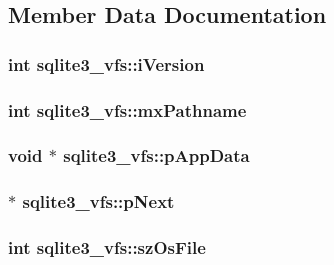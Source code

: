 \subsection{Member Data Documentation}
\hypertarget{structsqlite3__vfs_a694dd264949bd163545fe174510ed019}{
\subsubsection[{i\-Version}]{\setlength{\rightskip}{0pt plus 5cm}int sqlite3\-\_\-vfs\-::i\-Version}}\label{structsqlite3__vfs_a694dd264949bd163545fe174510ed019}
\hypertarget{structsqlite3__vfs_adb2d82c74891b00b5529fb94e7710135}{
\subsubsection[{mx\-Pathname}]{\setlength{\rightskip}{0pt plus 5cm}int sqlite3\-\_\-vfs\-::mx\-Pathname}}\label{structsqlite3__vfs_adb2d82c74891b00b5529fb94e7710135}
\hypertarget{structsqlite3__vfs_a8de686c5e679ba421479ac96d6654527}{
\subsubsection[{p\-App\-Data}]{\setlength{\rightskip}{0pt plus 5cm}void $\ast$ sqlite3\-\_\-vfs\-::p\-App\-Data}}\label{structsqlite3__vfs_a8de686c5e679ba421479ac96d6654527}
\hypertarget{structsqlite3__vfs_a4b12c503e4083854a9c4d91697a12de3}{
\subsubsection[{p\-Next}]{ $\ast$ sqlite3\-\_\-vfs\-::p\-Next}}\label{structsqlite3__vfs_a4b12c503e4083854a9c4d91697a12de3}
\hypertarget{structsqlite3__vfs_a549399081342d61134b6398562a0a997}{
\subsubsection[{sz\-Os\-File}]{\setlength{\rightskip}{0pt plus 5cm}int sqlite3\-\_\-vfs\-::sz\-Os\-File}}\label{structsqlite3__vfs_a549399081342d61134b6398562a0a997}
